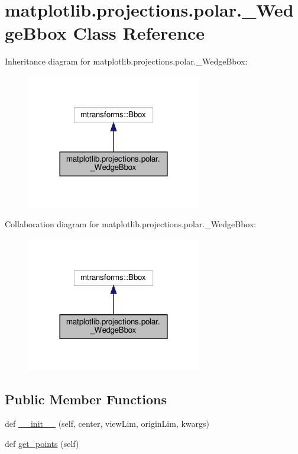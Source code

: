 \hypertarget{classmatplotlib_1_1projections_1_1polar_1_1__WedgeBbox}{}\section{matplotlib.\+projections.\+polar.\+\_\+\+Wedge\+Bbox Class Reference}
\label{classmatplotlib_1_1projections_1_1polar_1_1__WedgeBbox}


Inheritance diagram for matplotlib.\+projections.\+polar.\+\_\+\+Wedge\+Bbox\+:
\nopagebreak
\begin{figure}[H]
\begin{center}
\leavevmode
\includegraphics[width=216pt]{classmatplotlib_1_1projections_1_1polar_1_1__WedgeBbox__inherit__graph}
\end{center}
\end{figure}


Collaboration diagram for matplotlib.\+projections.\+polar.\+\_\+\+Wedge\+Bbox\+:
\nopagebreak
\begin{figure}[H]
\begin{center}
\leavevmode
\includegraphics[width=216pt]{classmatplotlib_1_1projections_1_1polar_1_1__WedgeBbox__coll__graph}
\end{center}
\end{figure}
\subsection*{Public Member Functions}
\begin{DoxyCompactItemize}
\item 
def \hyperlink{classmatplotlib_1_1projections_1_1polar_1_1__WedgeBbox_abc49a9b26f2e4a18d87a0ef02888c77d}{\+\_\+\+\_\+init\+\_\+\+\_\+} (self, center, view\+Lim, origin\+Lim, kwargs)
\item 
def \hyperlink{classmatplotlib_1_1projections_1_1polar_1_1__WedgeBbox_a46a7e81284bbd92e8038079b0266a13f}{get\+\_\+points} (self)
\end{DoxyCompactItemize}


